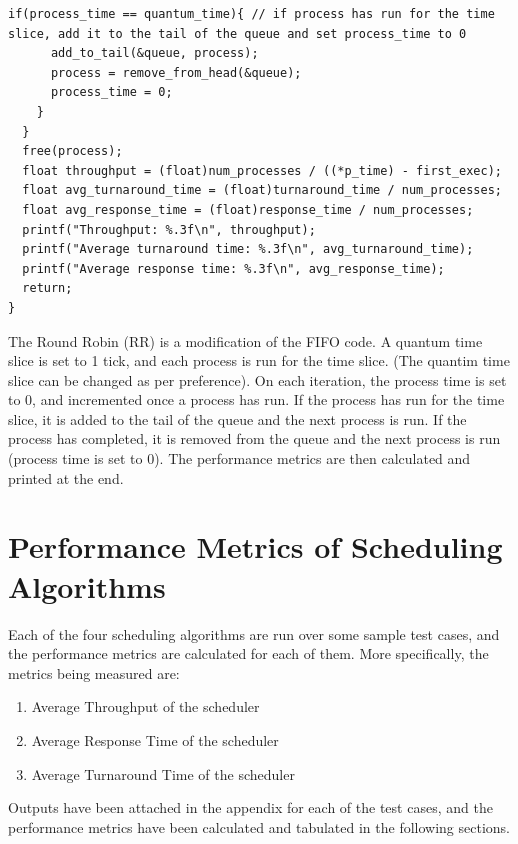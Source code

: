 \documentclass{article}
\theoremstyle{mytheoremstyle}
\theoremstyle{mytheoremstyle}
\theoremstyle{myproblemstyle}
\begin{document}
\begin{lstlisting}[caption={RR Scheduling Algorithm},label={lst:rr}]
    if(process_time == quantum_time){ // if process has run for the time slice, add it to the tail of the queue and set process_time to 0
      add_to_tail(&queue, process);
      process = remove_from_head(&queue);
      process_time = 0;
    }
  }
  free(process);
  float throughput = (float)num_processes / ((*p_time) - first_exec);
  float avg_turnaround_time = (float)turnaround_time / num_processes;
  float avg_response_time = (float)response_time / num_processes;
  printf("Throughput: %.3f\n", throughput);
  printf("Average turnaround time: %.3f\n", avg_turnaround_time);
  printf("Average response time: %.3f\n", avg_response_time);
  return;
}    
\end{lstlisting}
The Round Robin (RR) is a modification of the FIFO code. A quantum time slice is set to 1 tick, and each process is run for the  time slice. (The quantim time slice can be changed as per preference). On each iteration, the process time is set to 0, and incremented once a process has run. If the process has run for the time slice, it is added to the tail of the queue and the next process is run. If the process has completed, it is removed from the queue and the next process is run (process time is set to 0). The performance metrics are then calculated and printed at the end.

\newpage
\section{Performance Metrics of Scheduling Algorithms}
Each of the four scheduling algorithms are run over some sample test cases, and the performance metrics are calculated for each of them. More specifically, the metrics being measured are: \vspace*{-2mm}
\begin{enumerate}
  \item Average Throughput of the scheduler \vspace*{-2mm}
  \item Average Response Time of the scheduler \vspace*{-2mm}
  \item Average Turnaround Time of the scheduler
\end{enumerate}

Outputs have been attached in the appendix for each of the test cases, and the performance metrics have been calculated and tabulated in the following sections.
\end{document}
